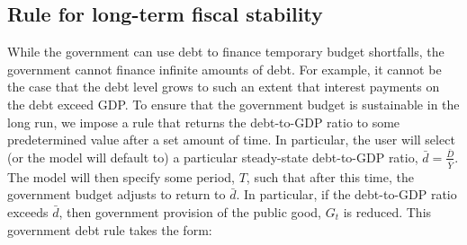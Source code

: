     \subsection{Rule for long-term fiscal stability}
      
      While the government can use debt to finance temporary budget shortfalls, the government cannot finance infinite amounts of debt.  For example, it cannot be the case that the debt level grows to such an extent that interest payments on the debt exceed GDP.  To ensure that the government budget is sustainable in the long run, we impose a rule that returns the debt-to-GDP ratio to some predetermined value after a set amount of time.  In particular, the user will select (or the model will default to) a particular steady-state debt-to-GDP ratio, $\bar{d}=\frac{\bar{D}}{\bar{Y}}$.  The model will then specify some period, $T$, such that after this time, the government budget adjusts to return to $\bar{d}$.  In particular, if the debt-to-GDP ratio exceeds $\bar{d}$, then government provision of the public good, $G_{t}$ is reduced.  This government debt rule takes the form: 
      
      
%
%
%
%
%
%

